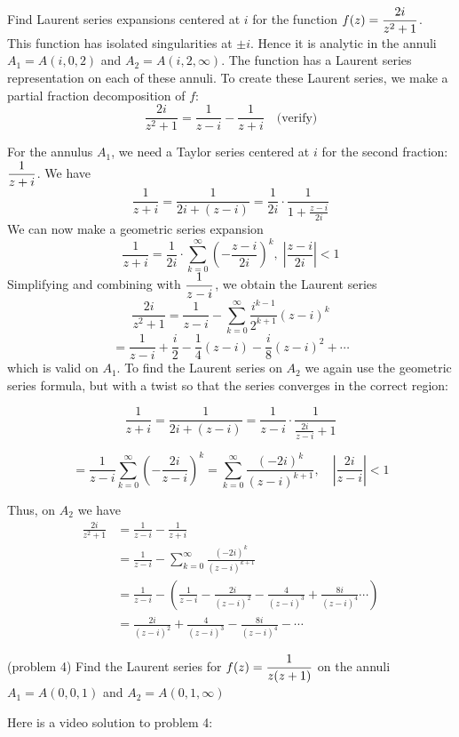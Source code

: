 \documentclass[handout]{ximera}
\begin{document}
\begin{example}[example 4]
Find Laurent series expansions centered at $i$ for the function $\displaystyle f(z) = \frac{2i}{z^2+1}$.\\
This function has isolated singularities at $\pm i$. Hence it is analytic in the annuli
$A_1 = A(i,0,2)$ and $A_2 = A(i, 2, \infty)$. The function has a Laurent series representation on each of these annuli.
To create these Laurent series, we make a partial fraction decomposition of $f$:
\[
\frac{2i}{z^2+1} = \frac{1}{z-i} - \frac{1}{z+i} \quad \text{(verify)}
\]

For the annulus $A_1$, we need a Taylor series centered at $i$ for the second fraction: $\displaystyle \frac{1}{z+i}$.
We have
\[
\frac{1}{z+i} = \frac{1}{2i+(z-i)} = \frac{1}{2i} \cdot \frac{1}{1+ \frac{z-i}{2i}}
\]
We can now make a geometric series expansion 
\[
\frac{1}{z+i} = \frac{1}{2i} \cdot \sum_{k=0}^\infty \left(-\frac{z-i}{2i}\right)^k, \; \left|\frac{z-i}{2i}\right| < 1
\]
Simplifying and combining with $\displaystyle \frac{1}{z-i}$, we obtain the Laurent series
\[
\frac{2i}{z^2+1} = \frac{1}{z-i} - \sum_{k=0}^\infty \frac{i^{k-1}}{2^{k+1}}(z-i)^k 
\]
\[
= \frac{1}{z-i} + \frac{i}{2} - \frac{1}{4}(z-i) - \frac{i}{8}(z-i)^2 + \cdots
\]
which is valid on $A_1$.
To find the Laurent series on $A_2$ we again use the geometric series formula, but with a twist so that the series converges in the correct region:

\[
\frac{1}{z+i} = \frac{1}{2i + (z-i)} = \frac{1}{z-i} \cdot  \frac{1}{\frac{2i}{z-i} +1}
\]

\[
= \frac{1}{z-i} \sum_{k=0}^\infty \left(-\frac{2i}{z-i}\right)^k = \sum_{k=0}^\infty \frac{(-2i)^k}{(z-i)^{k+1}}, \quad \left|\frac{2i}{z-i}\right| < 1
\]

Thus, on $A_2$ we have
\begin{align*}
\frac{2i}{z^2 +1} &= \frac{1}{z-i} -\frac{1}{z+i}\\
&=\frac{1}{z-i} - \sum_{k=0}^\infty \frac{(-2i)^k}{(z-i)^{k+1}}\\
&= \frac{1}{z-i} - \left(\frac{1}{z-i}-\frac{2i}{(z-i)^2}-\frac{4}{(z-i)^3}+\frac{8i}{(z-i)^4} \cdots \right)\\
&= \frac{2i}{(z-i)^2}+\frac{4}{(z-i)^3}-\frac{8i}{(z-i)^4} -\cdots
\end{align*}


\end{example}


\begin{problem}(problem 4)
Find the Laurent series for $\displaystyle f(z) = \frac{1}{z(z+1)}$ on the annuli $A_1 = A(0, 0, 1)$ and $A_2 = A(0, 1, \infty)$
\end{problem}

Here is a video solution to problem 4:\\
\begin{foldable}
\end{foldable}
\end{document}
